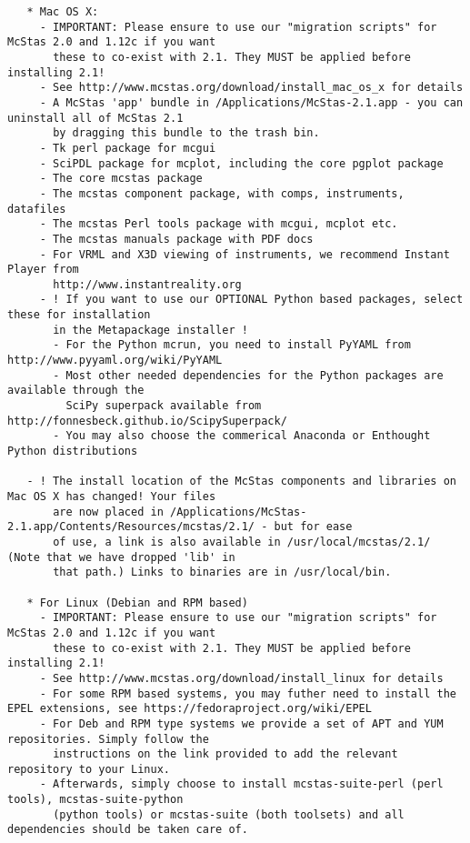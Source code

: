 \begin{lstlisting}
   * Mac OS X:
     - IMPORTANT: Please ensure to use our "migration scripts" for McStas 2.0 and 1.12c if you want
       these to co-exist with 2.1. They MUST be applied before installing 2.1!
     - See http://www.mcstas.org/download/install_mac_os_x for details
     - A McStas 'app' bundle in /Applications/McStas-2.1.app - you can uninstall all of McStas 2.1
       by dragging this bundle to the trash bin.
     - Tk perl package for mcgui
     - SciPDL package for mcplot, including the core pgplot package
     - The core mcstas package
     - The mcstas component package, with comps, instruments, datafiles
     - The mcstas Perl tools package with mcgui, mcplot etc.
     - The mcstas manuals package with PDF docs
     - For VRML and X3D viewing of instruments, we recommend Instant Player from
       http://www.instantreality.org
     - ! If you want to use our OPTIONAL Python based packages, select these for installation
       in the Metapackage installer !
       - For the Python mcrun, you need to install PyYAML from http://www.pyyaml.org/wiki/PyYAML
       - Most other needed dependencies for the Python packages are available through the 
       	 SciPy superpack available from http://fonnesbeck.github.io/ScipySuperpack/
       - You may also choose the commerical Anaconda or Enthought Python distributions
       
   - ! The install location of the McStas components and libraries on Mac OS X has changed! Your files
       are now placed in /Applications/McStas-2.1.app/Contents/Resources/mcstas/2.1/ - but for ease
       of use, a link is also available in /usr/local/mcstas/2.1/ (Note that we have dropped 'lib' in 
       that path.) Links to binaries are in /usr/local/bin.

   * For Linux (Debian and RPM based)
     - IMPORTANT: Please ensure to use our "migration scripts" for McStas 2.0 and 1.12c if you want
       these to co-exist with 2.1. They MUST be applied before installing 2.1! 
     - See http://www.mcstas.org/download/install_linux for details
     - For some RPM based systems, you may futher need to install the EPEL extensions, see https://fedoraproject.org/wiki/EPEL
     - For Deb and RPM type systems we provide a set of APT and YUM repositories. Simply follow the
       instructions on the link provided to add the relevant repository to your Linux.
     - Afterwards, simply choose to install mcstas-suite-perl (perl tools), mcstas-suite-python 
       (python tools) or mcstas-suite (both toolsets) and all dependencies should be taken care of.


\end{lstlisting}
